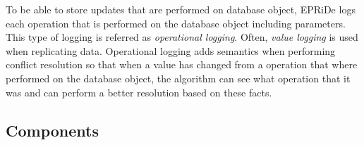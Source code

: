 To be able to store updates that are performed on database object, EPRiDe logs each operation that is performed on the database object including parameters. This type of logging is referred as \emph{operational logging}. Often, \emph{value logging} is used when replicating data. Operational logging adds semantics when performing conflict resolution so that when a value has changed from a operation that where performed on the database object, the algorithm can see what operation that it was and can perform a better resolution based on these facts.




	
	
	

	



\subsection{Components} %
\label{sub:components}

